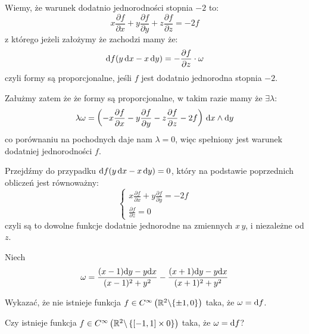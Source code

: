 \documentclass[11pt]{scrartcl}
\begin{document}
    Wiemy, że warunek dodatnio jednorodności stopnia $-2$ to:
    \[
        x \frac{\partial f}{\partial x} 
        + y \frac{\partial f}{\partial y} 
        + z \frac{\partial f}{\partial z}  
        = - 2f
    \]
    z którego jeżeli założymy że zachodzi mamy że:
    \[
        \text{d} f (y \, \text{d} x - x \, \text{d} y) = 
        - \frac{\partial f}{\partial z} \cdot \omega
    \]
    czyli formy są proporcjonalne, jeśli $f$ jest dodatnio jednorodna 
    stopnia $-2$.

    Załużmy zatem że że formy są proporcjonalne, 
    w takim razie mamy że $\exists \lambda$:
    \[
        \lambda \omega = 
        \left ( 
            - x \frac{\partial f}{\partial x} 
            - y \frac{\partial f}{\partial y} 
            - z \frac{\partial f}{\partial z} - 2f
        \right ) \, \text{d} x \wedge \text{d} y 
    \]
    co porównaniu na pochodnych daje nam $\lambda = 0$, więc spełniony jest 
    warunek dodatniej jednorodności $f$. 

    Przejdźmy do przypadku $\text{d} f (y \, \text{d} x - x \, \text{d} y) = 0$, 
    który na podstawie poprzednich obliczeń jest równoważny:
    \[
        \begin{cases}
            x \frac{\partial f}{\partial x} + 
            y \frac{\partial f}{\partial y} = -2 f \\
            \frac{\partial f}{\partial z} = 0
        \end{cases}
    \]
    czyli są to dowolne funkcje dodatnie jednorodne na zmiennych $x \, y$, 
    i niezależne od $z$.

    \begin{zadanie*}
        Niech
        \[
            \omega = \frac{(x-1) \text{d} y - y \text{d} x}{(x-1)^2 + y^2} -
            \frac{(x+1) \text{d} y - y \text{d} x}{(x+1)^2 + y^2}
        \]
        \begin{walk}
            \item Wykazać, że nie istnieje funkcja $f \in C^\infty \left ( 
                \mathbb R^2 \backslash \{ \pm 1, 0 \} \right )$
                taka, że $\omega = \text{d} f$.
            \item Czy istnieje funkcja 
                $f \in C^\infty \left ( 
                    \mathbb R^2 \backslash \left \{ [-1, 1] \times 0 \right \} 
                \right )$ taka, że $\omega = \text{d} f$?
        \end{walk}
    \end{zadanie*}
\end{document}
